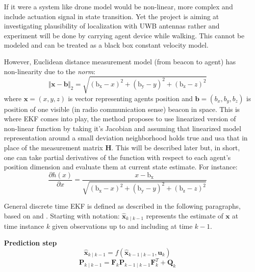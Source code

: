 If it were a system like drone model would be non-linear, more complex and include actuation signal in state transition. Yet the project is aiming at investigating plausibility of localization with UWB antennas rather and experiment will be done by carrying agent device while walking. This cannot be modeled and can be treated as  a black box constant velocity model.

However, Euclidean distance measurement model (from beacon to agent) has non-linearity due to the \emph{norm}:
$$
    \Vert\boldsymbol{x}-\boldsymbol{b}\Vert_2 = \sqrt{{\left(\mathrm{b_x}-x\right)}^2+{\left(\mathrm{b_y}-y\right)}^2+{\left(\mathrm{b_z}-z\right)}^2}
$$
where $\boldsymbol{x} = (x,y,z)$ is vector representing agents position and $\boldsymbol{b} = (b_x,b_y,b_z)$ is position of one visible (in radio communication sense) beacon in space. This is where EKF comes into play, the method proposes to use linearized version of non-linear function by taking it's Jacobian and assuming that linearized model representation around a small deviation neighborhood holds true and usa that in place of the measurement matrix $\boldsymbol{H}$. This will be described later but, in short, one can take partial derivatives of the function with respect to each agent's position dimension and evaluate them at current state estimate. For instance:
$$
    \frac{\partial h(x)}{\partial x} = \frac{x-\mathrm{b_x}}{\sqrt{{\left(\mathrm{b_x}-x\right)}^2+{\left(\mathrm{b_y}-y\right)}^2+{\left(\mathrm{b_z}-z\right)}^2}}
$$

General discrete time EKF is defined as described in the following paragraphs, based on \cite{probrobotics} and \cite{welch1995introduction}. Starting with notation: $\hat{\mathbf{x}}_{k \mid k-1}$ represents the  estimate of $\mathbf{x}$ at time instance $k$ given observations up to and including at time $k-1$. \smallskip

\textbf{Prediction step} \smallskip
$$\hat{\boldsymbol{x}}_{k \mid k-1}=f\left(\hat{\boldsymbol{x}}_{k-1 \mid k-1}, \boldsymbol{u}_k\right)$$
$$\boldsymbol{P}_{k \mid k-1}=\boldsymbol{F}_k \boldsymbol{P}_{k-1 \mid k-1} \boldsymbol{F}_k^T+\boldsymbol{Q}_k$$

